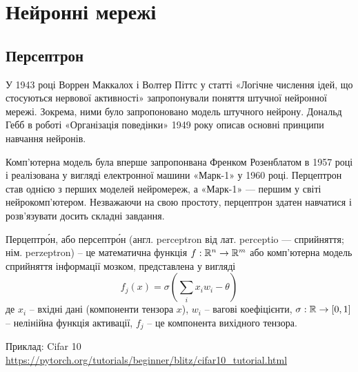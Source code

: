 \section{Нейронні мережі}

\subsection{Персептрон}

У 1943 році Воррен Маккалох і Волтер Піттс у статті «Логічне числення ідей, що стосуються нервової активності» запропонували поняття штучної нейронної мережі. Зокрема, ними було запропоновано модель штучного нейрону. Дональд Гебб в роботі «Організація поведінки» 1949 року описав основні принципи навчання нейронів. 

Комп'ютерна модель була вперше запропонвана Френком Розенблатом в 1957 році і реалізована у вигляді електронної машини «Марк-1» у 1960 році. Перцептрон став однією з перших моделей нейромереж, а «Марк-1» — першим у світі нейрокомп'ютером. Незважаючи на свою простоту, перцептрон здатен навчатися і розв'язувати досить складні завдання.

\begin{ozn}
Перцептро́н, або персептро́н (англ. perceptron від лат. perceptio — сприйняття; нім. perzeptron) -- це математична функція $f: \Bbb R^n \rightarrow \Bbb R^m$ або комп'ютерна модель сприйняття інформації мозком, представлена у вигляді
\begin{equation}
 f_j(x) = \sigma (\sum_i x_i w_i - \theta)
\end{equation}
де $x_i$ -- вхідні дані (компоненти тензора $x$),  $w_i$ -- вагові коефіцієнти, $\sigma: \Bbb R \rightarrow [0, 1]$ -- нелінійна функція активації, $f_j$ -- це компонента вихідного тензора.
\end{ozn}


Приклад: Cifar 10 \url{https://pytorch.org/tutorials/beginner/blitz/cifar10_tutorial.html}